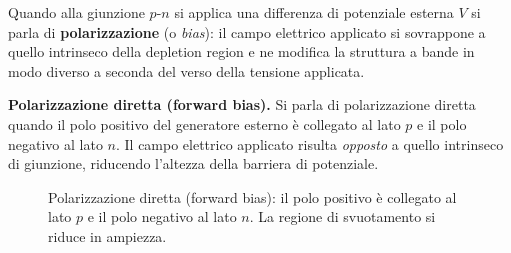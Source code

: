 Quando alla giunzione \( p \)-\( n \) si applica una differenza di potenziale esterna \( V \) si parla di \textbf{polarizzazione} (o \emph{bias}): il campo elettrico applicato si sovrappone a quello intrinseco della depletion region e ne modifica la struttura a bande in modo diverso a seconda del verso della tensione applicata.

\textbf{Polarizzazione diretta (forward bias).} Si parla di polarizzazione diretta quando il polo positivo del generatore esterno è collegato al lato \( p \) e il polo negativo al lato \( n \). Il campo elettrico applicato risulta \emph{opposto} a quello intrinseco di giunzione, riducendo l'altezza della barriera di potenziale.

\begin{figure}[htbp]
    \centering
    \caption{Polarizzazione diretta (forward bias): il polo positivo è collegato al lato \( p \) e il polo negativo al lato \( n \). La regione di svuotamento si riduce in ampiezza.}
    \label{fig:forward_bias}
\end{figure}

